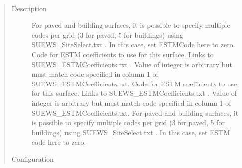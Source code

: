 \documentclass[letterpaper,10pt,english]{sphinxmanual}
\begin{document}
\begin{fulllineitems}
\label{\detokenize{input_files/SUEWS_SiteInfo/Input_Options:cmdoption-arg-estmcode}}~\begin{quote}\begin{description}
\item[{Description}] \leavevmode
For paved and building surfaces, it is possible to specify multiple codes per grid (3 for paved, 5 for buildings) using SUEWS\_SiteSelect.txt . In this case, set ESTMCode here to zero. Code for ESTM coefficients to use for this surface. Links to SUEWS\_ESTMCoefficients.txt . Value of integer is arbitrary but must match code specified in column 1 of SUEWS\_ESTMCoefficients.txt.  Code for ESTM coefficients to use for this surface. Links to SUEWS\_ESTMCoefficients.txt . Value of integer is arbitrary but must match code specified in column 1 of SUEWS\_ESTMCoefficients.txt.  For paved and building surfaces, it is possible to specify multiple codes per grid (3 for paved, 5 for buildings) using SUEWS\_SiteSelect.txt . In this case, set ESTM code here to zero.

\item[{Configuration}] \leavevmode


\end{description}
\end{quote}
\end{fulllineitems}
\end{document}
